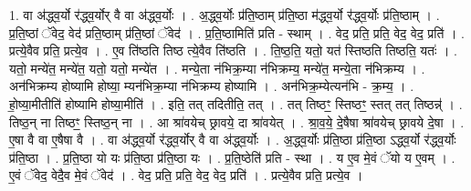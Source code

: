 \documentclass[17pt]{extarticle}
\begin{document}
1. वा अ॑द्ध्व॒र्यो र॑द्ध्व॒र्योर् वै वा अ॑द्ध्व॒र्योः । . अ॒द्ध्व॒र्योः प्र॑ति॒ष्ठाम् प्र॑ति॒ष्ठा म॑द्ध्व॒र्यो र॑द्ध्व॒र्योः प्र॑ति॒ष्ठाम् । . प्र॒ति॒ष्ठां ॅवेद॒ वेद॑ प्रति॒ष्ठाम् प्र॑ति॒ष्ठां ॅवेद॑ । . प्र॒ति॒ष्ठामिति॑ प्रति - स्थाम् । . वेद॒ प्रति॒ प्रति॒ वेद॒ वेद॒ प्रति॑ । . प्रत्ये॒वैव प्रति॒ प्रत्ये॒व । . ए॒व ति॑ष्ठति तिष्ठ त्ये॒वैव ति॑ष्ठति । . ति॒ष्ठ॒ति॒ यतो॒ यत॑ स्तिष्ठति तिष्ठति॒ यतः॑ । . यतो॒ मन्ये॑त॒ मन्ये॑त॒ यतो॒ यतो॒ मन्ये॑त । . मन्ये॒ता न॑भिक्र॒म्या न॑भिक्रम्य॒ मन्ये॑त॒ मन्ये॒ता न॑भिक्रम्य । . अन॑भिक्रम्य होष्यामि होष्या॒ म्यन॑भिक्र॒म्या न॑भिक्रम्य होष्यामि । . अन॑भिक्र॒म्येत्यन॑भि - क्र॒म्य॒ । . हो॒ष्या॒मीतीति॑ होष्यामि होष्या॒मीति॑ । . इति॒ तत् तदितीति॒ तत् । . तत् तिष्ठꣳ॒॒ स्तिष्ठꣳ॒॒ स्तत् तत् तिष्ठन्न्॑ । . तिष्ठ॒न् ना तिष्ठꣳ॒॒ स्तिष्ठ॒न् ना । . आ श्रा॑वयेच् छ्रावये॒ दा श्रा॑वयेत् । . श्रा॒व॒ये॒ दे॒षैषा श्रा॑वयेच् छ्रावये दे॒षा । . ए॒षा वै वा ए॒षैषा वै । . वा अ॑द्ध्व॒र्यो र॑द्ध्व॒र्योर् वै वा अ॑द्ध्व॒र्योः । . अ॒द्ध्व॒र्योः प्र॑ति॒ष्ठा प्र॑ति॒ष्ठा ऽद्ध्व॒र्यो र॑द्ध्व॒र्योः प्र॑ति॒ष्ठा । . प्र॒ति॒ष्ठा यो यः प्र॑ति॒ष्ठा प्र॑ति॒ष्ठा यः । . प्र॒ति॒ष्ठेति॑ प्रति - स्था । . य ए॒व मे॒वं ॅयो य ए॒वम् । . ए॒वं ॅवेद॒ वेदै॒व मे॒वं ॅवेद॑ । . वेद॒ प्रति॒ प्रति॒ वेद॒ वेद॒ प्रति॑ । . प्रत्ये॒वैव प्रति॒ प्रत्ये॒व । \newline
\end{document}
